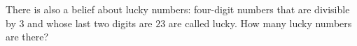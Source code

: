There is also a belief about lucky numbers: four-digit numbers that are divisible by $3$ and whose last two digits are $23$ are called lucky. How many lucky numbers are there?
